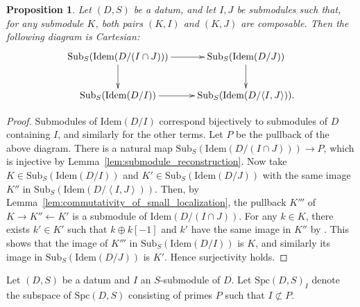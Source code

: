 \documentclass[11pt]{amsart}
\theoremstyle{definition}
\theoremstyle{plain}
\newtheorem{prop}[defn]{Proposition}
\theoremstyle{remark}
\newcommand{\Idem}{\mathrm{Idem}}
\newcommand{\Sub}{\mathrm{Sub}}
\newcommand{\ang}[1]{{\left\langle{#1}\right\rangle}}
\newcommand{\Spc}{\mathrm{Spc}}
\numberwithin{equation}{section}
\begin{document}
\begin{prop}\label{prop:cartesian_diagram_of_submodules}
Let \((D,S)\) be a datum, and let \(I,J\) be submodules such that, for any submodule \(K\), both pairs \((K,I)\) and \((K,J)\) are composable.  
Then the following diagram is Cartesian:
\[
  \xymatrix{
    \Sub_S(\Idem(D/(I\cap J)))\ar[d]\ar[r]&\Sub_S(\Idem(D/J))\ar[d]\\
    \Sub_S(\Idem(D/I))\ar[r]&\Sub_S(\Idem(D/\ang{I,J})).
  }
\]
\end{prop}
\begin{proof}
Submodules of \(\Idem(D/I)\) correspond bijectively to submodules of \(D\) containing \(I\), and similarly for the other terms.  
Let \(P\) be the pullback of the above diagram.  
There is a natural map \(\Sub_S(\Idem(D/(I\cap J)))\to P\), which is injective by Lemma~\ref{lem:submodule_reconstruction}.  
Now take \(K\in \Sub_S(\Idem(D/I))\) and \(K'\in \Sub_S(\Idem(D/J))\) with the same image \(K''\) in \(\Sub_S(\Idem(D/\ang{I,J}))\).  
Then, by Lemma~\ref{lem:commutativity_of_small_localization}, the pullback \(K'''\) of \(K\to K''\gets K'\) is a submodule of \(\Idem(D/(I\cap J))\).  
For any \(k\in K\), there exists \(k'\in K'\) such that \(k\oplus k[-1]\) and \(k'\) have the same image in \(K''\) by \cite[Theorem~2.1]{Th}.  
This shows that the image of \(K'''\) in \(\Sub_S(\Idem(D/I))\) is \(K\), and similarly its image in \(\Sub_S(\Idem(D/J))\) is \(K'\).  
Hence surjectivity holds.
\end{proof}



Let \((D,S)\) be a datum and \(I\) an \(S\)-submodule of \(D\).
Let \(\Spc(D,S)_I\) denote the subspace of \(\Spc(D,S)\) consisting of primes \(P\) such that \(I\not\subset P\).
\end{document}
